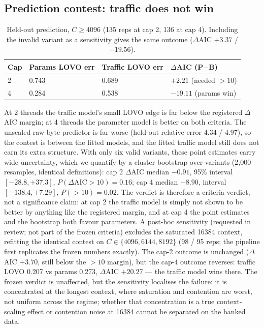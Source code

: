 \documentclass[11pt]{article}
\begin{document}
\subsection{Prediction contest: traffic does not win}
\label{sec:contest}
\begin{table}[ht]
\centering\small
\begin{tabular}{@{}llll@{}}
\toprule
Cap & Params LOVO err & Traffic LOVO err & $\Delta$AIC (P$-$B) \\
\midrule
2 & 0.743 & 0.689 & $+2.21$ (needed $>10$) \\
4 & 0.284 & 0.538 & $-19.11$ (params win) \\
\bottomrule
\end{tabular}
\caption{Held-out prediction, $C\geq4096$ (135 reps at cap 2,
136 at cap 4). Including
the invalid variant as a sensitivity gives the same outcome
($\Delta$AIC $+3.37$ / $-19.56$).}
\end{table}
At 2 threads the traffic model's small LOVO edge is far below the
registered $\Delta$AIC margin; at 4 threads the parameter model is
better on both criteria. The unscaled raw-byte predictor is far
worse (held-out relative error 4.34 / 4.97), so the contest is
between the fitted models, and the fitted traffic model still does
not earn its extra structure.
With only six valid variants, these point estimates carry wide
uncertainty, which we quantify by a cluster bootstrap over
variants (2{,}000 resamples, identical definitions): cap 2
$\Delta$AIC median $-0.91$, 95\% interval $[-28.8, +37.3]$,
$P(\Delta\text{AIC}>10)=0.16$; cap 4 median $-8.90$, interval
$[-138.4, +7.29]$, $P(>10)=0.02$. The verdict is therefore a
criteria verdict, not a significance claim: at cap 2 the traffic
model is simply not shown to be better by anything like the
registered margin, and at cap 4 the point estimates and the
bootstrap both favour parameters.
A post-hoc sensitivity (requested in review; not part of the
frozen criteria) excludes the saturated 16384 context, refitting
the identical contest on $C\in\{4096,6144,8192\}$ (98 / 95 reps;
the pipeline first replicates the frozen numbers exactly). The
cap-2 outcome is unchanged ($\Delta$AIC $+3.70$, still below the
$>10$ margin), but the cap-4 outcome reverses: traffic LOVO 0.207
vs params 0.273, $\Delta$AIC $+20.27$ --- the traffic model wins
there. The frozen verdict is unaffected, but the sensitivity
localises the failure: it is concentrated at the longest context,
where saturation and contention are worst, not uniform across the
regime; whether that concentration is a true context-scaling
effect or contention noise at 16384 cannot be separated on the
banked data.
\end{document}
